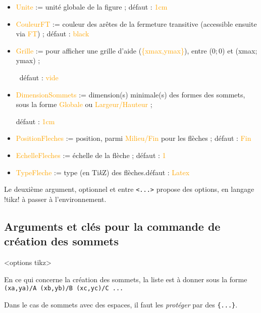 \documentclass[french,a4paper,11pt]{article}
\providecommand\tikzlogo{Ti\textit{k}Z}
\let\TikZ\tikzlogo
\newcommand\Cle[1]{{\small\sffamily\textlangle \textcolor{orange}{#1}\textrangle}}
\begin{document}
{{\begin{tipblock}
\begin{itemize}
	\hfill{}défaut : \Cle{thick}
	\item \Cle{Unite} := unité globale de la figure ; \hfill{}défaut : \Cle{1cm}
	\item \Cle{CouleurFT} := couleur des arêtes de la fermeture transitive (accessible ensuite via \Cle{FT}) ; \hfill{}défaut : \Cle{black}
	\item \Cle{Grille} := pour afficher une grille d'aide (\Cle{\{xmax,ymax\}}), entre (0;\,0) et (xmax;\,ymax) ;
	
	\hfill~défaut : \Cle{vide}
	\item \Cle{DimensionSommets} := dimension(s) minimale(s) des formes des sommets, sous la forme \Cle{Globale} ou \Cle{Largeur/Hauteur} ;
	
	\hfill{}défaut : \Cle{1cm}
	\item \Cle{PositionFleches} := position, parmi \Cle{Milieu/Fin} pour les flèches ; \hfill{}défaut : \Cle{Fin}
	\item \Cle{EchelleFleches} := échelle de la flèche ; \hfill{}défaut : \Cle{1}
	\item \Cle{TypeFleche} := type (en \TikZ) des flèches.\hfill{}défaut : \Cle{Latex}
\end{itemize}

Le deuxième argument, optionnel et entre \texttt{<...>} propose des options, en langage \packagetex!tikz! à passer à l'environnement.
\end{tipblock}

\pagebreak

\subsection{Arguments et clés pour la commande de création des sommets}

\begin{DemoCode}
\begin{GrapheTikz}[clés]<options tikz>
\end{GrapheTikz}
\end{DemoCode}

\begin{tipblock}
En ce qui concerne la création des sommets, la liste est à donner sous la forme \verb!(xa,ya)/A (xb,yb)/B (xc,yc)/C ...!

\smallskip

Dans le cas de sommets avec des espaces, il faut les \textit{protéger} par des \texttt{\{...\}}.
\end{tipblock}

}}
\end{document}
